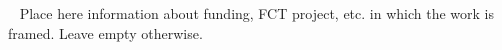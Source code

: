 \clearpage
\ifodd\thepage\else
\null
\clearpage
\fi

\null
\thispagestyle{empty}
\pagecolor{PANTONE1807C}
\afterpage{\nopagecolor}
\newpage

\begin{backcover}
\thispagestyle{empty}
\pagecolor{PANTONECoolGray7C}
\afterpage{\nopagecolor}
\color{white}
{~\vfill
\noindent
Place here information about funding, FCT project, etc. in which the work is framed. Leave empty otherwise.
\vfill ~}
\end{backcover}

